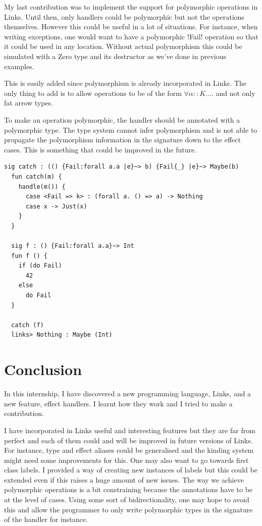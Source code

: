 \documentclass[10pt, nonacm=true, language=french, language=english]{acmart}
\begin{document}
My last contribution was to implement the support for polymorphic operations in Links. Until then, only handlers could be polymorphic but not the operations themselves. However this could be useful in a lot of situations. For instance, when writing exceptions, one would want to have a polymorphic !Fail! operation so that it could be used in any location. Without actual polymorphism this could be simulated with a Zero type and its destructor as we've done in previous examples.

This is easily added since polymorphism is already incorporated in Links. The only thing to add is to allow operations to be of the form $\forall \alpha ::K. \dots$ and not only fat arrow types.

To make an operation polymorphic, the handler should be annotated with a polymorphic type. The type system cannot infer polymorphism and is not able to propagate the polymorphism information in the signature down to the effect cases. This is something that could be improved in the future.

\begin{lstlisting}[caption=Polymorphism example]
  sig catch : (() {Fail:forall a.a |e}~> b) {Fail{_} |e}~> Maybe(b)
  fun catch(m) {
    handle(m()) {
      case <Fail => k> : (forall a. () => a) -> Nothing
      case x -> Just(x)
    }
  }

  sig f : () {Fail:forall a.a}~> Int
  fun f () {
    if (do Fail)
      42
    else
      do Fail
  }

  catch (f)
  links> Nothing : Maybe (Int)
\end{lstlisting}



\section{Conclusion}
\label{sec:conclusion}

In this internship, I have discovered a new programming language, Links, and a new feature, effect handlers. I learnt how they work and I tried to make a contribution.

I have incorporated in Links useful and interesting features but they are far from perfect and each of them could and will be improved in future versions of Links. For instance, type and effect aliases could be generalised and the kinding system might need some improvements for this. One may also want to go towards first class labels. I provided a way of creating new instances of labels but this could be extended even if this raises a huge amount of new issues. The way we achieve polymorphic operations is a bit constraining because the annotations have to be at the level of cases. Using some sort of bidirectionality, one may hope to avoid this and allow the programmer to only write polymorphic types in the signature of the handler for instance.
\end{document}

